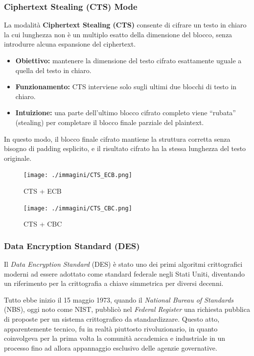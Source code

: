 \documentclass{report}
\begin{document}
\subsubsection{Ciphertext Stealing (CTS) Mode}

La modalità \textbf{Ciphertext Stealing (CTS)} consente di cifrare un testo in chiaro la cui lunghezza non è un multiplo esatto della dimensione del blocco, senza introdurre alcuna espansione del ciphertext.

\begin{itemize}
    \item \textbf{Obiettivo:} mantenere la dimensione del testo cifrato esattamente uguale a quella del testo in chiaro.
    \item \textbf{Funzionamento:} CTS interviene solo sugli ultimi due blocchi di testo in chiaro.
    \item \textbf{Intuizione:} una parte dell’ultimo blocco cifrato completo viene “rubata” (stealing) per completare il blocco finale parziale del plaintext.
\end{itemize}

In questo modo, il blocco finale cifrato mantiene la struttura corretta senza bisogno di padding esplicito, e il risultato cifrato ha la stessa lunghezza del testo originale.
\begin{figure}[h]
    \centering
    \texttt{[image: ./immagini/CTS\_ECB.png]}
    \caption{CTS + ECB}
   
\end{figure}

\begin{figure}[h]
    \centering
    \texttt{[image: ./immagini/CTS\_CBC.png]}
    \caption{CTS + CBC}
\end{figure}

\subsubsection{Data Encryption Standard (DES)}

Il \textit{Data Encryption Standard} (DES) è stato uno dei primi algoritmi crittografici moderni ad essere adottato come standard federale negli Stati Uniti, diventando un riferimento per la crittografia a chiave simmetrica per diversi decenni.

Tutto ebbe inizio il 15 maggio 1973, quando il \textit{National Bureau of Standards} (NBS), oggi noto come NIST, pubblicò nel \textit{Federal Register} una richiesta pubblica di proposte per un sistema crittografico da standardizzare. Questo atto, apparentemente tecnico, fu in realtà piuttosto rivoluzionario, in quanto coinvolgeva per la prima volta la comunità accademica e industriale in un processo fino ad allora appannaggio esclusivo delle agenzie governative.
\end{document}

